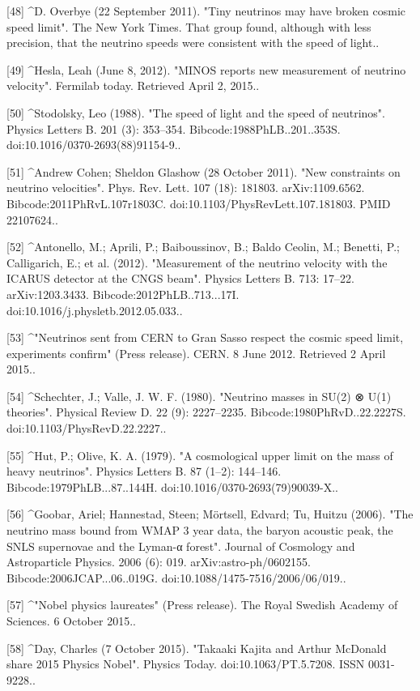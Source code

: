 [48]
^D. Overbye (22 September 2011). "Tiny neutrinos may have broken cosmic speed limit". The New York Times. That group found, although with less precision, that the neutrino speeds were consistent with the speed of light..

[49]
^Hesla, Leah (June 8, 2012). "MINOS reports new measurement of neutrino velocity". Fermilab today. Retrieved April 2, 2015..

[50]
^Stodolsky, Leo (1988). "The speed of light and the speed of neutrinos". Physics Letters B. 201 (3): 353–354. Bibcode:1988PhLB..201..353S. doi:10.1016/0370-2693(88)91154-9..

[51]
^Andrew Cohen; Sheldon Glashow (28 October 2011). "New constraints on neutrino velocities". Phys. Rev. Lett. 107 (18): 181803. arXiv:1109.6562. Bibcode:2011PhRvL.107r1803C. doi:10.1103/PhysRevLett.107.181803. PMID 22107624..

[52]
^Antonello, M.; Aprili, P.; Baiboussinov, B.; Baldo Ceolin, M.; Benetti, P.; Calligarich, E.; et al. (2012). "Measurement of the neutrino velocity with the ICARUS detector at the CNGS beam". Physics Letters B. 713: 17–22. arXiv:1203.3433. Bibcode:2012PhLB..713...17I. doi:10.1016/j.physletb.2012.05.033..

[53]
^"Neutrinos sent from CERN to Gran Sasso respect the cosmic speed limit, experiments confirm" (Press release). CERN. 8 June 2012. Retrieved 2 April 2015..

[54]
^Schechter, J.; Valle, J. W. F. (1980). "Neutrino masses in SU(2) ⊗ U(1) theories". Physical Review D. 22 (9): 2227–2235. Bibcode:1980PhRvD..22.2227S. doi:10.1103/PhysRevD.22.2227..

[55]
^Hut, P.; Olive, K. A. (1979). "A cosmological upper limit on the mass of heavy neutrinos". Physics Letters B. 87 (1–2): 144–146. Bibcode:1979PhLB...87..144H. doi:10.1016/0370-2693(79)90039-X..

[56]
^Goobar, Ariel; Hannestad, Steen; Mörtsell, Edvard; Tu, Huitzu (2006). "The neutrino mass bound from WMAP 3 year data, the baryon acoustic peak, the SNLS supernovae and the Lyman-α forest". Journal of Cosmology and Astroparticle Physics. 2006 (6): 019. arXiv:astro-ph/0602155. Bibcode:2006JCAP...06..019G. doi:10.1088/1475-7516/2006/06/019..

[57]
^"Nobel physics laureates" (Press release). The Royal Swedish Academy of Sciences. 6 October 2015..

[58]
^Day, Charles (7 October 2015). "Takaaki Kajita and Arthur McDonald share 2015 Physics Nobel". Physics Today. doi:10.1063/PT.5.7208. ISSN 0031-9228..

